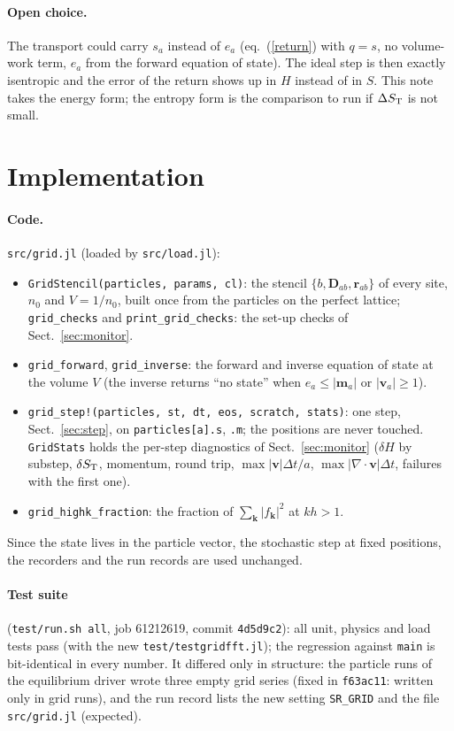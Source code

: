 \documentclass[11pt,aps,preprint,nofootinbib,superscriptaddress,tightenlines]{revtex4-2}
\def\Eq#1{eq.~(\ref{#1})}
\def\Sect#1{Sect.~\ref{#1}}
\let\oldparagraph\paragraph
\renewcommand{\paragraph}{\par\bigskip\oldparagraph}
\begin{document}
\paragraph{Open choice.}  The transport could carry $s_a$ instead of $e_a$
(\Eq{return} with $q=s$, no volume-work term, $e_a$ from the forward equation of
state).  The ideal step is then exactly isentropic and the error of the return shows
up in $H$ instead of in $S$.  This note takes the energy form; the entropy form is
the comparison to run if $\Delta S_{\rm T}$ is not small.

\section{Implementation}
\label{sec:impl}

\paragraph{Code.}  \texttt{src/grid.jl} (loaded by \texttt{src/load.jl}):
\begin{itemize}
\item \texttt{GridStencil(particles, params, cl)}: the stencil $\{b,\bm D_{ab},\bm r_{ab}\}$ of every site,
  $n_0$ and $V=1/n_0$, built once from the particles on the perfect lattice;
  \texttt{grid\_checks} and \texttt{print\_grid\_checks}: the set-up checks of \Sect{sec:monitor}.
\item \texttt{grid\_forward}, \texttt{grid\_inverse}: the forward and inverse equation of state at the
  volume $V$ (the inverse returns ``no state'' when $e_a\le|\bm m_a|$ or $|\bm v_a|\ge1$).
\item \texttt{grid\_step!(particles, st, dt, eos, scratch, stats)}: one step, \Sect{sec:step}, on
  \texttt{particles[a].s}, \texttt{.m}; the positions are never touched.  \texttt{GridStats} holds the
  per-step diagnostics of \Sect{sec:monitor} ($\delta H$ by substep, $\delta S_{\rm T}$, momentum,
  round trip, $\max|\bm v|\Delta t/a$, $\max|\nabla\cdot\bm v|\Delta t$, failures with the first one).
\item \texttt{grid\_highk\_fraction}: the fraction of $\sum_{\bm k}|f_{\bm k}|^2$ at $kh>1$.
\end{itemize}
Since the state lives in the particle vector, the stochastic step at fixed positions, the
recorders and the run records are used unchanged.

\paragraph{Test suite} (\texttt{test/run.sh all}, job 61212619, commit \texttt{4d5d9c2}): all unit, physics and
load tests pass (with the new \texttt{test/testgridfft.jl}); the regression against \texttt{main} is
bit-identical in every number.  It differed only in structure: the particle runs of the equilibrium
driver wrote three empty grid series (fixed in \texttt{f63ac11}: written only in grid runs), and the run
record lists the new setting \texttt{SR\_GRID} and the file \texttt{src/grid.jl} (expected).
\end{document}
